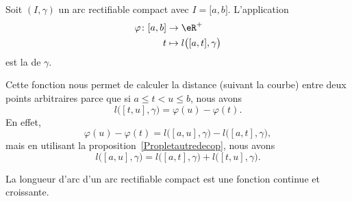 \begin{definition}
    Soit $(I,\gamma)$ un arc rectifiable compact avec $I=\mathopen[ a , b \mathclose]$. L'application
    \begin{equation}
        \begin{aligned}
            \varphi\colon \mathopen[ a , b \mathclose]&\to \eR^+ \\
            t&\mapsto l\big( \mathopen[ a , t \mathclose],\gamma \big)
        \end{aligned}
    \end{equation}
    est la  de $\gamma$.
\end{definition}
Cette fonction nous permet de calculer la distance (suivant la courbe) entre deux points arbitraires parce que si $a\leq t<u\leq b$, nous avons
\begin{equation}
    l\big( [t,u],\gamma \big)=\varphi(u)-\varphi(t).
\end{equation}
En effet,
\begin{equation}
    \varphi(u)-\varphi(t)=l\big( [a,u],\gamma \big)-l\big( [a,t],\gamma \big),
\end{equation}
mais en utilisant la proposition~\ref{Propletautredecop}, nous avons
\begin{equation}
    l\big( [a,u],\gamma \big)=l\big( [a,t],\gamma \big)+l\big( [t,u],\gamma \big).
\end{equation}

\begin{proposition}
    La longueur d'arc d'un arc rectifiable compact est une fonction continue et croissante.
\end{proposition}

